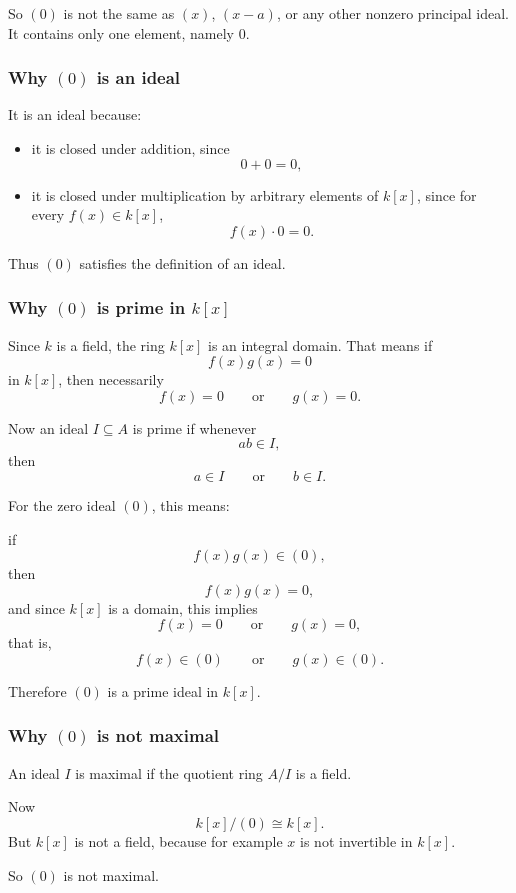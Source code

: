 \documentclass[12pt,a4paper]{article}
\theoremstyle{notespace}
\theoremstyle{definition}
\begin{document}
So \((0)\) is not the same as \((x)\), \((x-a)\), or any other nonzero principal ideal. It contains only one element, namely \(0\).

\subsubsection{Why \((0)\) is an ideal}

It is an ideal because:

\begin{itemize}
	\item it is closed under addition, since
	\[
	0+0=0,
	\]
	\item it is closed under multiplication by arbitrary elements of \(k[x]\), since for every \(f(x)\in k[x]\),
	\[
	f(x)\cdot 0 = 0.
	\]
\end{itemize}

Thus \((0)\) satisfies the definition of an ideal.

\subsubsection{Why \((0)\) is prime in \(k[x]\)}

Since \(k\) is a field, the ring \(k[x]\) is an integral domain.  
That means if
\[
f(x)g(x)=0
\]
in \(k[x]\), then necessarily
\[
f(x)=0
\qquad\text{or}\qquad
g(x)=0.
\]

Now an ideal \(I\subseteq A\) is prime if whenever
\[
ab\in I,
\]
then
\[
a\in I
\qquad\text{or}\qquad
b\in I.
\]

For the zero ideal \((0)\), this means:

if
\[
f(x)g(x)\in (0),
\]
then
\[
f(x)g(x)=0,
\]
and since \(k[x]\) is a domain, this implies
\[
f(x)=0
\qquad\text{or}\qquad
g(x)=0,
\]
that is,
\[
f(x)\in (0)
\qquad\text{or}\qquad
g(x)\in (0).
\]

Therefore \((0)\) is a prime ideal in \(k[x]\).

\subsubsection{Why \((0)\) is not maximal}

An ideal \(I\) is maximal if the quotient ring \(A/I\) is a field.

Now
\[
k[x]/(0)\cong k[x].
\]
But \(k[x]\) is not a field, because for example \(x\) is not invertible in \(k[x]\).

So \((0)\) is not maximal.
\end{document}
